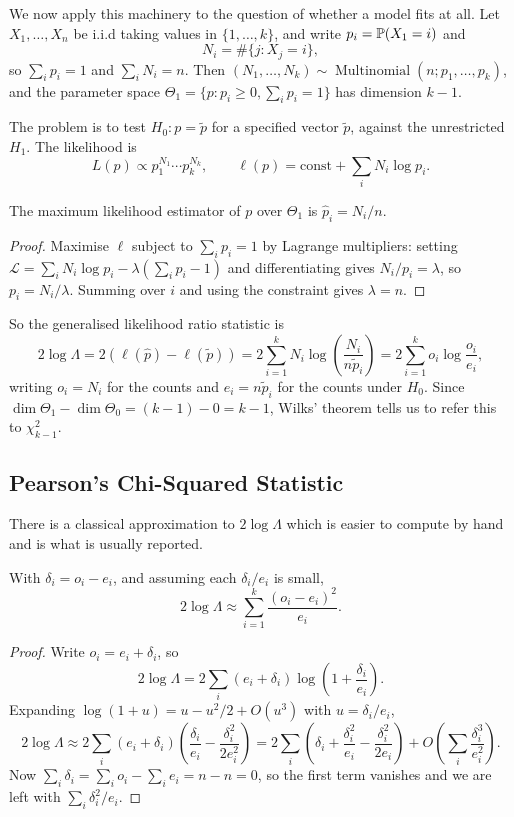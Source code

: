 \documentclass[a4paper]{scrartcl}
\newcommand{\Multi}{\operatorname{Multinomial}}
\begin{document}
We now apply this machinery to the question of whether a model fits at all. Let $X_1, \dots, X_n$ be i.i.d taking values in $\{1, \dots, k\}$, and write $p_i = \mathbb{P}(X_1 = i)$ and
$$
N_i = \#\{j : X_j = i\},
$$
so $\sum_i p_i = 1$ and $\sum_i N_i = n$. Then $(N_1,\dots,N_k) \sim \Multi(n; p_1, \dots, p_k)$, and the parameter space $\Theta_1 = \{p : p_i \geq 0, \sum_i p_i = 1\}$ has dimension $k-1$.

The  problem is to test $H_0 : p = \tilde p$ for a specified vector $\tilde p$, against the unrestricted $H_1$. The likelihood is
$$
L(p) \propto p_1^{N_1}\cdots p_k^{N_k}, \qquad \ell(p) = \text{const} + \sum_i N_i \log p_i.
$$

\begin{lemma}
  The maximum likelihood estimator of $p$ over $\Theta_1$ is $\hat p_i = N_i/n$.
\end{lemma}
\begin{proof}
  Maximise $\ell$ subject to $\sum_i p_i = 1$ by Lagrange multipliers: setting $\mathcal{L} = \sum_i N_i\log p_i - \lambda(\sum_i p_i - 1)$ and differentiating gives $N_i/p_i = \lambda$, so $p_i = N_i/\lambda$. Summing over $i$ and using the constraint gives $\lambda = n$.
\end{proof}

So the generalised likelihood ratio statistic is
$$
2\log\Lambda = 2\left(\ell(\hat p) - \ell(\tilde p)\right) = 2\sum_{i=1}^{k}N_i\log\left(\frac{N_i}{n\tilde p_i}\right) = 2\sum_{i=1}^{k}o_i\log\frac{o_i}{e_i},
$$
writing $o_i = N_i$ for the  counts and $e_i = n\tilde p_i$ for the counts  under $H_0$. Since $\dim\Theta_1 - \dim\Theta_0 = (k-1) - 0 = k-1$, Wilks' theorem tells us to refer this to $\chi^2_{k-1}$.

\subsection{Pearson's Chi-Squared Statistic}

There is a classical approximation to $2\log\Lambda$ which is easier to compute by hand and is what is usually reported.

\begin{proposition}
  With $\delta_i = o_i - e_i$, and assuming each $\delta_i/e_i$ is small,
  $$
  2\log\Lambda \approx \sum_{i=1}^{k}\frac{(o_i-e_i)^2}{e_i}.
  $$
\end{proposition}
\begin{proof}
  Write $o_i = e_i + \delta_i$, so
  $$
  2\log\Lambda = 2\sum_i (e_i+\delta_i)\log\left(1 + \frac{\delta_i}{e_i}\right).
  $$
  Expanding $\log(1+u) = u - u^2/2 + O(u^3)$ with $u = \delta_i/e_i$,
  $$
  2\log\Lambda \approx 2\sum_i (e_i+\delta_i)\left(\frac{\delta_i}{e_i} - \frac{\delta_i^2}{2e_i^2}\right) = 2\sum_i\left(\delta_i + \frac{\delta_i^2}{e_i} - \frac{\delta_i^2}{2e_i}\right) + O\!\left(\sum_i \frac{\delta_i^3}{e_i^2}\right).
  $$
  Now $\sum_i\delta_i = \sum_i o_i - \sum_i e_i = n - n = 0$, so the first term vanishes and we are left with $\sum_i \delta_i^2/e_i$.
\end{proof}
\end{document}
